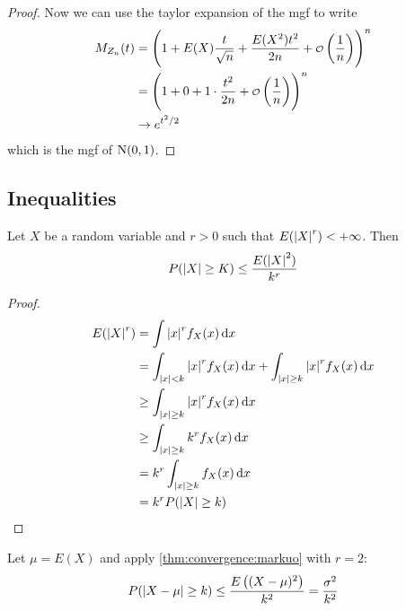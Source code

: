 \documentclass[12pt]{extarticle}
\newcommand{\Normal}{{\operatorfont N}}
\begin{document}
\begin{proof}
    Now we can use the taylor expansion of the mgf to write
    \begin{align}
        M_{Z_n}(t) & = \left(1+E(X) \frac{t}{\sqrt{n}} + \frac{E(X^2) t^2}{2n} + \o\left(\frac{1}{n}\right)\right)^n \\
                   & = \left(1 + 0 + 1 \cdot \frac{t^2}{2n} + \o\left(\frac{1}{n}\right)\right)^n                    \\
                   & \to e^{t^2 / 2}
    \end{align}
    which is the mgf of $\Normal(0, 1)$.
\end{proof}

\subsection{Inequalities}

\begin{theorem}
    \label{thm:convergence:markuo}
    Let $X$ be a random variable and $r > 0$ such that $E(\abs{X}^r) < + \infty$.
    Then
    \begin{equation}
        P(\abs{X} \geq K) \leq \frac{E(\abs{X}^2)}{k^r}
    \end{equation}
\end{theorem}

\begin{proof}
    \begin{align}
        E(\abs{X}^r) & = \int \abs{x}^r f_X (x) \dd{x}                                                                \\
                     & = \int_{\abs{x} < k} \abs{x}^r f_X (x) \dd{x} + \int_{\abs{x} \geq k} \abs{x}^r f_X (x) \dd{x} \\
                     & \geq \int_{\abs{x} \geq k} \abs{x}^r f_X (x) \dd{x}                                            \\
                     & \geq \int_{\abs{x} \geq k} k^r f_X (x) \dd{x}                                                  \\
                     & = k^r \int_{\abs{x} \geq k} f_X (x) \dd{x}                                                     \\
                     & = k^r P(\abs{X} \geq k)
    \end{align}
\end{proof}

\begin{theorem}
    \label{thm:convergence:chebyshev}
    Let $\mu = E(X)$ and apply \autoref{thm:convergence:markuo} with $r = 2$:
    \begin{equation}
        P(\abs{X - \mu} \geq k) \leq \frac{E\left((X - \mu)^2\right)}{k^2} = \frac{\sigma^2}{k^2}
    \end{equation}
\end{theorem}
\end{document}
